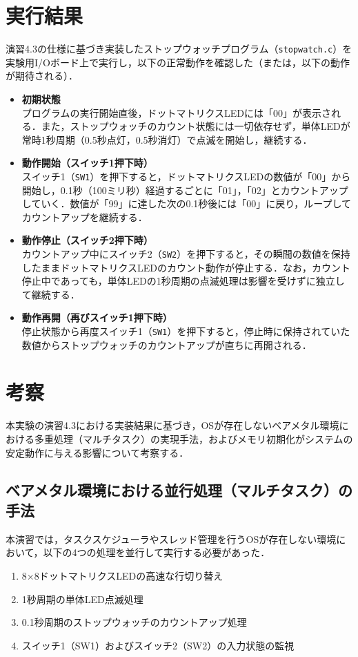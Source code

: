 \documentclass{jlreq}
\begin{document}
  \section{実行結果}
  演習4.3の仕様に基づき実装したストップウォッチプログラム（\texttt{stopwatch.c}）を実験用I/Oボード上で実行し，以下の正常動作を確認した（または，以下の動作が期待される）．

  \begin{itemize}
      \item \textbf{初期状態} \\
      プログラムの実行開始直後，ドットマトリクスLEDには「00」が表示される．また，ストップウォッチのカウント状態には一切依存せず，単体LEDが常時1秒周期（0.5秒点灯，0.5秒消灯）で点滅を開始し，継続する．
      
      \item \textbf{動作開始（スイッチ1押下時）} \\
      スイッチ1（\texttt{SW1}）を押下すると，ドットマトリクスLEDの数値が「00」から開始し，0.1秒（100ミリ秒）経過するごとに「01」，「02」とカウントアップしていく．数値が「99」に達した次の0.1秒後には「00」に戻り，ループしてカウントアップを継続する．
      
      \item \textbf{動作停止（スイッチ2押下時）} \\
      カウントアップ中にスイッチ2（\texttt{SW2}）を押下すると，その瞬間の数値を保持したままドットマトリクスLEDのカウント動作が停止する．なお，カウント停止中であっても，単体LEDの1秒周期の点滅処理は影響を受けずに独立して継続する．
      
      \item \textbf{動作再開（再びスイッチ1押下時）} \\
      停止状態から再度スイッチ1（\texttt{SW1}）を押下すると，停止時に保持されていた数値からストップウォッチのカウントアップが直ちに再開される．
  \end{itemize}

  \section{考察}
  本実験の演習4.3における実装結果に基づき，OSが存在しないベアメタル環境における多重処理（マルチタスク）の実現手法，およびメモリ初期化がシステムの安定動作に与える影響について考察する．

  \subsection{ベアメタル環境における並行処理（マルチタスク）の手法}
  本演習では，タスクスケジューラやスレッド管理を行うOSが存在しない環境において，以下の4つの処理を並行して実行する必要があった．
  \begin{enumerate}
      \item 8$\times$8ドットマトリクスLEDの高速な行切り替え
      \item 1秒周期の単体LED点滅処理
      \item 0.1秒周期のストップウォッチのカウントアップ処理
      \item スイッチ1（SW1）およびスイッチ2（SW2）の入力状態の監視
  \end{enumerate}
\end{document}
